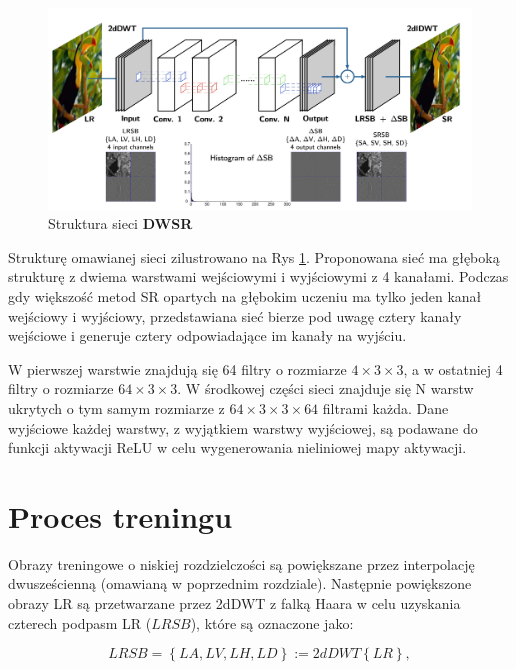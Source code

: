 \begin{figure}[ht]
    \centering
    \begin{minipage}[t]{0.9\linewidth}
        \includegraphics[width=\linewidth]{Rozdziały/03.DWSR/Obrazy/strultura_DWSR.png}  
        \caption{Struktura sieci \textbf{DWSR}}
        \label{fig:image49}
    \end{minipage}
\end{figure}

Strukturę omawianej sieci \cite{guo2017deep} zilustrowano na Rys \ref{fig:image49}. Proponowana sieć ma głęboką strukturę z dwiema warstwami wejściowymi i wyjściowymi z 4 kanałami. Podczas gdy większość metod SR opartych na głębokim uczeniu ma tylko jeden kanał wejściowy i wyjściowy, przedstawiana sieć bierze pod uwagę cztery kanały wejściowe i generuje cztery odpowiadające im kanały na wyjściu. 

W pierwszej warstwie znajdują się 64 filtry o rozmiarze $4 \times  3 \times 3$, a w ostatniej 4 filtry o rozmiarze $64 \times  3 \times 3$. W środkowej części sieci znajduje się N warstw ukrytych o tym samym rozmiarze z $64 \times  3 \times 3 \times 64$ filtrami każda. Dane wyjściowe każdej warstwy, z wyjątkiem warstwy wyjściowej, są podawane do funkcji aktywacji ReLU w celu wygenerowania nieliniowej mapy aktywacji.


\section{Proces treningu}

Obrazy treningowe o niskiej rozdzielczości są powiększane przez interpolację dwusześcienną (omawianą w poprzednim rozdziale). Następnie powiększone obrazy LR są przetwarzane przez 2dDWT z falką Haara w celu uzyskania czterech podpasm LR ($LRSB$), które są oznaczone jako:

\begin{equation}
    L R S B = \left\{ LA, LV, LH, LD \right\} := 2dDWT\left\{LR\right\}, \label{eq:3.2}
\end{equation}

